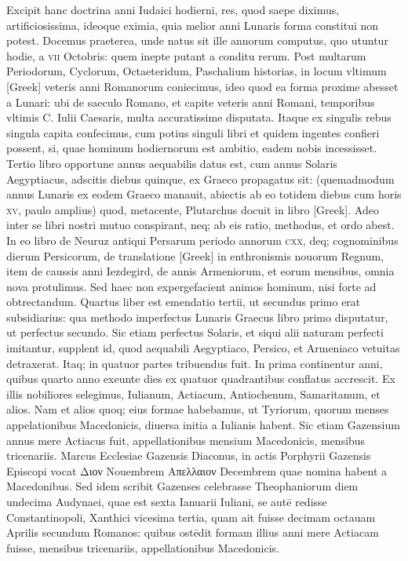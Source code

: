 \begin{parnumbers}
{}
Excipit hanc doctrina anni Iudaici hodierni, res, quod
saepe diximus, artificiosissima, ideoque eximia, quia melior
anni Lunaris forma constitui non potest.
\lnr{}Docemus praeterea, unde
natus sit ille annorum computus, quo utuntur hodie, a \textsc{vii} Octobris:
quem inepte putant a conditu rerum.
\lnr{}Post multarum Periodorum,
Cyclorum, Octaeteridum, Paschalium historias, in locum vltimum
\textgreek{[Greek]} veteris anni Romanorum coniecimus, ideo
quod ea forma proxime abesset a Lunari: ubi de saeculo Romano,
et capite veteris anni Romani, temporibus vltimis C. Iulii Caesaris,
multa accuratissime disputata.
\lnr{}Itaque ex singulis rebus singula capita
confecimus, cum potius singuli libri et quidem ingentes confieri
possent, si, quae hominum hodiernorum est ambitio, eadem nobis
incessisset.
\lnr{}Tertio libro opportune annus aequabilis datus est,
cum annus Solaris Aegyptiacus, adscitis diebus quinque, ex Graeco
propagatus sit: (quemadmodum annus Lunaris ex eodem Graeco
manauit, abiectis ab eo totidem diebus cum horis \textsc{xv}, paulo amplius)
quod, metacente, Plutarchus docuit in libro \textgreek{[Greek]}.
\lnr{}Adeo inter se libri nostri mutuo conspirant, neq; ab eis ratio,
methodus, et ordo abest.
\lnr{}In eo libro de Neuruz antiqui Persarum
periodo annorum \textsc{cxx}, deq; cognominibus dierum Persicorum,
de translatione \textgreek{[Greek]} in enthronismis nouorum Regnum,
item de caussis anni Iezdegird, de annis Armeniorum, et eorum
mensibus, omnia nova protulimus. 
\lnr{}Sed haec non expergefacient animos
hominum, nisi forte ad obtrectandum.
\lnr{}Quartus liber est emendatio
tertii, ut secundus primo erat subsidiarius: qua methodo imperfectus
Lunaris Graecus libro primo disputatur, ut perfectus secundo.
\lnr{}Sic etiam perfectus Solaris, et siqui alii naturam perfecti imitantur,
supplent id, quod aequabili Aegyptiaco, Persico, et Armeniaco
vetuitas detraxerat.
\lnr{}Itaq; in quatuor partes tribuendus fuit.
\lnr{}In
prima continentur anni, quibus quarto anno exeunte dies ex quatuor
quadrantibus conflatus accrescit.
\lnr{}Ex illis nobiliores selegimus,
Iulianum, Actiacum, Antiochenum, Samaritanum, et alios. 
\lnr{}Nam et alios quoq; eius formae habebamus, ut Tyriorum, quorum menses
appelationibus Macedonicis, diuersa initia a Iulianis habent.
\lnr{}Sic
etiam Gazensium annus mere Actiacus fuit, appellationibus mensium 
Macedonicis, mensibus tricenariis. 
\lnr{}Marcus Ecclesiae Gazensis Diaconus,
in actis Porphyrii Gazensis Episcopi vocat \textgreek{Διον} Nouembrem
\textgreek{Απελλαιον} Decembrem quae nomina habent a Macedonibus. 
\lnr{}Sed
idem scribit Gazenses celebrasse Theophaniorum diem undecima
Audynaei, quae est sexta Ianuarii Iuliani, se autē redisse Constantinopoli,
Xanthici vicesima tertia, quam ait fuisse decimam octauam
Aprilis secundum Romanos: quibus ostēdit formam illius anni mere
Actiacam fuisse, mensibus tricenariis, appellationibus Macedonicis. 


\end{parnumbers}
